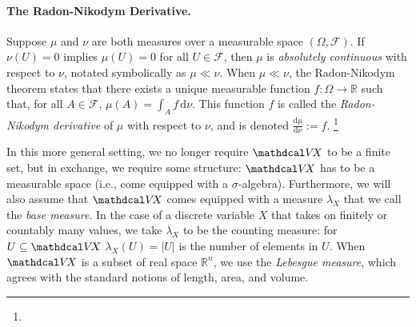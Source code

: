 \paragraph{The Radon-Nikodym Derivative.}
Suppose $\mu$ and $\nu$ are both measures over a measurable space $(\Omega,\mathcal F)$.
If $\nu(U) = 0$ implies $\mu(U) = 0$ for all $U \in \mathcal F$, then
$\mu$ is \emph{absolutely continuous} with respect to $\nu$,
    notated symbolically as $\mu \ll \nu$.
When $\mu \ll \nu$, the Radon-Nikodym theorem \citep{nikodym1930generalisation} 
states that there exists a unique 
    measurable function $f : \Omega \to \mathbb R$
such that, for all $A \in \mathcal F$,
$
    \mu(A) = \int_{A} f \,\mathrm d \nu.
$
This function $f$ is called the \emph{Radon-Nikodym derivative} of $\mu$ with respect to $\nu$, and is denoted $\frac{\mathrm d\mu}{\mathrm d\nu} := f$.
\unskip\footnote{%
}

In this more general setting, we no longer require $\V\!X$ to be a finite set, but in exchange, we require some structure: $\V\!X$ has to be a measurable space (i.e., come equipped with a $\sigma$-algebra).
%
Furthermore, we will also assume that $\V\!X$ comes equipped with a measure $\lambda_X$ that we call the \emph{base measure}. 
In the case of a discrete variable $X$ that takes on finitely or countably many values, we take $\lambda_X$ to be the counting measure: for $U \subseteq \V\!X$ $\lambda_X(U) = |U|$ is the number of elements in $U$. 
When $\V\!X$ is a subset of real space $\mathbb R^n$, we use the
\emph{Lebesgue measure}, which agrees with the standard notions of length, area, and volume.


